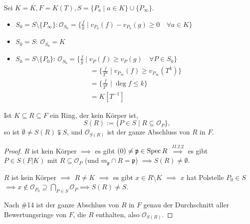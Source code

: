 \begin{beispiel}
    Sei $K = \overline{K}, F = K(T), S = \{P_a \mid a \in K\} \cup \{P_\infty\}$.
    \begin{itemize}
        \item $S_0 = S \setminus \{P_\infty\}: \mathcal{O}_{S_0} = \{\frac{f}{g} \mid v_{P_a}(f) - v_{P_a}(g) \geq 0 \quad \forall a \in K\}$
        \item $S_0 = S$: $\mathcal{O}_{S_0} = K$
        \item $S_0 = S \setminus \{P_0\}$: $\mathcal{O}_{S_0}=\{\frac{f}{g} \mid v_P(f) \geq v_P(g) \quad \forall P \in S_0\}$
        \begin{align*}
            & = \{\frac{f}{T^k} \mid v_{P_\infty} (f) \geq v_{P_\infty}(T^k)\}\\
            & = \{\frac{f}{T^k} \mid \deg f \leq k\}\\
            & = K[T^{-1}]
        \end{align*}
    \end{itemize}
\end{beispiel}

\begin{lemma}
    Ist $K \subseteq R \subseteq F$ ein Ring, der kein Körper ist,
    $$ S(R) := \{P \in S \mid R \subseteq \mathcal{O}_P\},$$
    so ist $\emptyset \ne S(R) \subsetneqq S$, und $\mathcal{O}_{S(R)}$ ist der ganze Abschluss von $R$ in $F$.
\end{lemma}
\begin{proof}
    $R$ ist kein Körper $\implies$ es gibt $(0) \neq \mathfrak{p} \in \operatorname{Spec} R$
    $\stackrel{II.2.2}{\implies}$ es gibt $P \in S(F|K)$ mit $R \subseteq \mathcal{O}_P$ (und $m_\mathfrak{p} \cap R = \mathfrak{p}$)
    $\implies S(R) \ne \emptyset$.

    $R$ ist kein Körper $\implies$ $R \ne K$ $\implies$ es gibt $x \in R\setminus K$ $\implies$ $x$ hat Polstelle $P_0 \in S$
    $\implies x \notin \mathcal{O}_{P_0} \supseteq \bigcap\limits_{P \in S} \mathcal{O}_P \implies S(R) \ne S$.
    
    Nach \#14 ist der ganze Abschluss von $R$ in $F$ genau der Durchschnitt aller Bewertungsringe von $F$, die $R$ enthalten, also
    $\mathcal{O}_{S(R)}$.
\end{proof}

